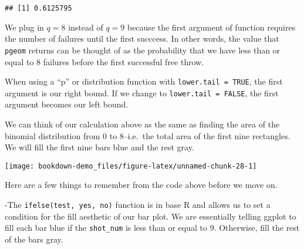 \documentclass[
]{book}
\newenvironment{Shaded}{\begin{snugshade}}{\end{snugshade}}
\newcommand{\AttributeTok}[1]{\textcolor[rgb]{0.77,0.63,0.00}{#1}}
\newcommand{\CommentTok}[1]{\textcolor[rgb]{0.56,0.35,0.01}{\textit{#1}}}
\newcommand{\DecValTok}[1]{\textcolor[rgb]{0.00,0.00,0.81}{#1}}
\newcommand{\FunctionTok}[1]{\textcolor[rgb]{0.00,0.00,0.00}{#1}}
\newcommand{\NormalTok}[1]{#1}
\newcommand{\SpecialCharTok}[1]{\textcolor[rgb]{0.00,0.00,0.00}{#1}}
\newcommand{\StringTok}[1]{\textcolor[rgb]{0.31,0.60,0.02}{#1}}
\begin{document}
\begin{verbatim}
## [1] 0.6125795
\end{verbatim}

We plug in \(q=8\) instead of \(q=9\) because the first argument of function requires the number of failures until the first succcess. In other words, the value that \texttt{pgeom} returns can be thought of as the probability that we have less than or equal to 8 failures before the first successful free throw.

When using a ``p'' or distribution function with \texttt{lower.tail\ =\ TRUE}, the first argument is our right bound. If we change to \texttt{lower.tail\ =\ FALSE}, the first argument becomes our left bound.

We can think of our calculation above as the same as finding the area of the binomial distribution from 0 to 8--i.e.~the total area of the first nine rectangles. We will fill the first nine bars blue and the rest gray.

\begin{Shaded}
\end{Shaded}

\begin{center}\texttt{[image: bookdown-demo\_files/figure-latex/unnamed-chunk-28-1]} \end{center}

Here are a few things to remember from the code above before we move on.

-The \texttt{ifelse(test,\ yes,\ no)} function is in base R and allows us to set a condition for the fill aesthetic of our bar plot. We are essentially telling ggplot to fill each bar blue if the \texttt{shot\_num} is less than or equal to 9. Otherwise, fill the rest of the bars gray.
\end{document}
